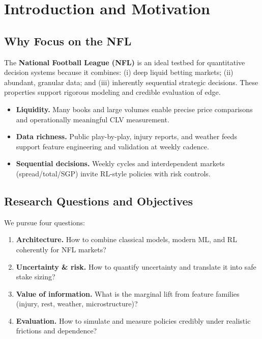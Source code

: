 \chapter{Introduction and Motivation}
\label{chap:intro}

\section{Why Focus on the NFL}

The \textbf{National Football League (NFL)} is an ideal testbed for quantitative decision systems because it combines: (i) deep liquid betting markets; (ii) abundant, granular data; and (iii) inherently sequential strategic decisions. These properties support rigorous modeling and credible evaluation of edge.

\begingroup\RaggedRight\sloppy{}
\begin{itemize}
  \item \textbf{Liquidity.} Many books and large volumes enable precise price comparisons and operationally meaningful CLV measurement.
  \item \textbf{Data richness.} Public play-by-play, injury reports, and weather feeds support feature engineering and validation at weekly cadence.
  \item \textbf{Sequential decisions.} Weekly cycles and interdependent markets (spread/total/SGP) invite RL-style policies with risk controls.
\end{itemize}
\endgroup

\section{Research Questions and Objectives}

We pursue four questions:
\begin{enumerate}
  \item \textbf{Architecture.} How to combine classical models, modern ML, and RL coherently for NFL markets?
  \item \textbf{Uncertainty \& risk.} How to quantify uncertainty and translate it into safe stake sizing?
  \item \textbf{Value of information.} What is the marginal lift from feature families (injury, rest, weather, microstructure)?
  \item \textbf{Evaluation.} How to simulate and measure policies credibly under realistic frictions and dependence?
\end{enumerate}

